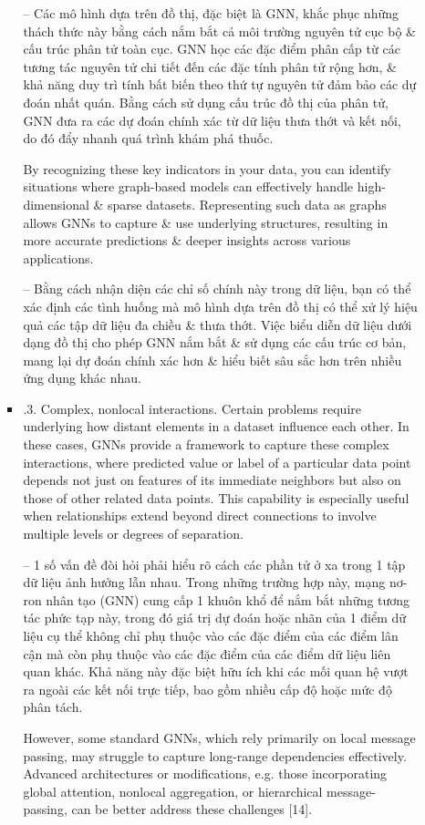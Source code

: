 \documentclass{article}
\begin{document}
\begin{itemize}
\begin{itemize}
\begin{itemize}
            -- Các mô hình dựa trên đồ thị, đặc biệt là GNN, khắc phục những thách thức này bằng cách nắm bắt cả môi trường nguyên tử cục bộ \& cấu trúc phân tử toàn cục. GNN học các đặc điểm phân cấp từ các tương tác nguyên tử chi tiết đến các đặc tính phân tử rộng hơn, \& khả năng duy trì tính bất biến theo thứ tự nguyên tử đảm bảo các dự đoán nhất quán. Bằng cách sử dụng cấu trúc đồ thị của phân tử, GNN đưa ra các dự đoán chính xác từ dữ liệu thưa thớt và kết nối, do đó đẩy nhanh quá trình khám phá thuốc.

            By recognizing these key indicators in your data, you can identify situations where graph-based models can effectively handle high-dimensional \& sparse datasets. Representing such data as graphs allows GNNs to capture \& use underlying structures, resulting in more accurate predictions \& deeper insights across various applications.

            -- Bằng cách nhận diện các chỉ số chính này trong dữ liệu, bạn có thể xác định các tình huống mà mô hình dựa trên đồ thị có thể xử lý hiệu quả các tập dữ liệu đa chiều \& thưa thớt. Việc biểu diễn dữ liệu dưới dạng đồ thị cho phép GNN nắm bắt \& sử dụng các cấu trúc cơ bản, mang lại dự đoán chính xác hơn \& hiểu biết sâu sắc hơn trên nhiều ứng dụng khác nhau.
            \item {.3. Complex, nonlocal interactions.} Certain problems require underlying how distant elements in a dataset influence each other. In these cases, GNNs provide a framework to capture these complex interactions, where predicted value or label of a particular data point depends not just on features of its immediate neighbors but also on those of other related data points. This capability is especially useful when relationships extend beyond direct connections to involve multiple levels or degrees of separation.

            -- 1 số vấn đề đòi hỏi phải hiểu rõ cách các phần tử ở xa trong 1 tập dữ liệu ảnh hưởng lẫn nhau. Trong những trường hợp này, mạng nơ-ron nhân tạo (GNN) cung cấp 1 khuôn khổ để nắm bắt những tương tác phức tạp này, trong đó giá trị dự đoán hoặc nhãn của 1 điểm dữ liệu cụ thể không chỉ phụ thuộc vào các đặc điểm của các điểm lân cận mà còn phụ thuộc vào các đặc điểm của các điểm dữ liệu liên quan khác. Khả năng này đặc biệt hữu ích khi các mối quan hệ vượt ra ngoài các kết nối trực tiếp, bao gồm nhiều cấp độ hoặc mức độ phân tách.

            However, some standard GNNs, which rely primarily on local message passing, may struggle to capture long-range dependencies effectively. Advanced architectures or modifications, e.g. those incorporating global attention, nonlocal aggregation, or hierarchical message-passing, can be better address these challenges [14].


\end{itemize}
\end{itemize}
\end{itemize}
\end{document}

